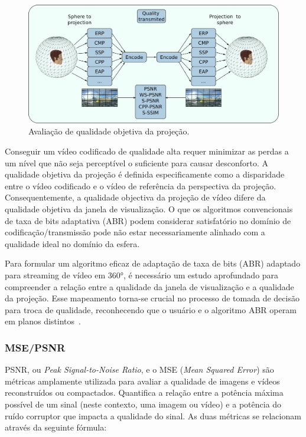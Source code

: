 \begin{figure}[htb]
    \centering
    \includegraphics[width=0.7\linewidth]{fig/diagrama e qualidade 1.png}
    \caption{Avaliação de qualidade objetiva da projeção.}
    \label{fig:QualityDiagram}
\end{figure}

Conseguir um vídeo codificado de qualidade alta requer minimizar as perdas a um nível que não seja perceptível o suficiente para causar desconforto. A qualidade objetiva da projeção é definida especificamente como a disparidade entre o vídeo codificado e o vídeo de referência da perspectiva da projeção. Consequentemente, a qualidade objectiva da projeção de vídeo difere da qualidade objetiva da janela de visualização. O que os algoritmos convencionais de taxa de bits adaptativa (ABR) podem considerar satisfatório no domínio de codificação/transmissão pode não estar necessariamente alinhado com a qualidade ideal no domínio da esfera.

Para formular um algoritmo eficaz de adaptação de taxa de bits (ABR) adaptado para streaming de vídeo em 360°, é necessário um estudo aprofundado para compreender a relação entre a qualidade da janela de visualização e a qualidade da projeção. Esse mapeamento torna-se crucial no processo de tomada de decisão para troca de qualidade, reconhecendo que o usuário e o algoritmo ABR operam em planos distintos~\cite{tran2017, Xu2020}.

\subsubsection{MSE/PSNR}

PSNR, ou \textit{Peak Signal-to-Noise Ratio}, e o MSE (\textit{Mean Squared Error}) são métricas amplamente utilizada para avaliar a qualidade de imagens e vídeos reconstruídos ou compactados. Quantifica a relação entre a potência máxima possível de um sinal (neste contexto, uma imagem ou vídeo) e a potência do ruído corruptor que impacta a qualidade do sinal. As duas métricas se relacionam através da seguinte fórmula:

